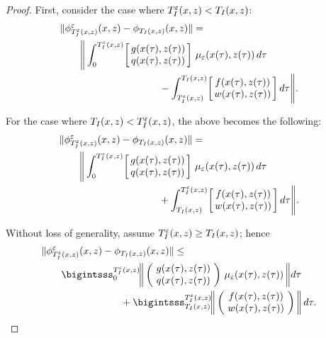 \documentclass[twocolumn]{article}
\begin{document}
\begin{proof}
  First, consider the case where $T_{I}^{\varepsilon}(x, z) < T_{I}(x, z)$:
  \begin{align}
    \lefteqn{\| \floweps_{\TIe(\zdx,\zdz)}\argsxz - \flow_{\TI(\zdx,\zdz)}\argsxz \| =}\\
    \nonumber
    & \hspace{2em} \Bigg\| \int_{0}^{\TIe\argsxz} \! \left[\!\!\begin{array}{c} g\argstxz\\ q\argstxz \end{array}\!\!\right] \, \mueps\argstxz \, d\tau\\ 
    \nonumber
    & \hspace{10em} \mbox{} - \int_{\TIe\argsxz}^{\TI\argsxz} \! \left[\!\!\begin{array}{c} f\argstxz\\ w\argstxz \end{array}\!\!\right] d\tau \Bigg\|.
  \end{align}
  
  For the case where $T_{I}(x, z) < T_{I}^{\varepsilon}(x, z)$, the above becomes the following:
  \begin{align}
    \lefteqn{\| \floweps_{\TIe(\zdx,\zdz)}\argsxz - \flow_{\TI(\zdx,\zdz)}\argsxz \| =}\\
    \nonumber
    & \hspace{2em} \Bigg\| \int_{0}^{\TIe\argsxz} \! \left[\!\!\begin{array}{c} g\argstxz\\ q\argstxz \end{array}\!\!\right] \, \mueps\argstxz \, d\tau\\ 
    \nonumber
    & \hspace{10em} \mbox{} + \int_{\TI\argsxz}^{\TIe\argsxz} \! \left[\!\!\begin{array}{c} f\argstxz\\ w\argstxz \end{array}\!\!\right] d\tau \Bigg\|.
  \end{align}

Without loss of generality, assume $T_{I}^{\varepsilon}(x, z) \geq T_{I}(x, z)$; hence
\begin{align}
  \lefteqn{\| \floweps_{\TIe(\zdx,\zdz)}\argsxz - \flow_{\TI(\zdx,\zdz)}\argsxz \| \leq}\\
  \nonumber
  & \hspace{2em} \bigintsss_{0}^{\TIe\argsxz} \! \bigg\| \left(\!\begin{array}{c} g\argstxz\\ q\argstxz \end{array}\!\right) \, \mueps\argstxz \, \bigg\| d\tau\\
  \nonumber
  & \hspace{8em} \mbox{} + \bigintsss_{\TI\argsxz}^{\TIe\argsxz} \! \bigg\| \left(\!\begin{array}{c} f\argstxz\\ w\argstxz \end{array}\!\right) \bigg\| \, d\tau.
\end{align}


\end{proof}
\end{document}
